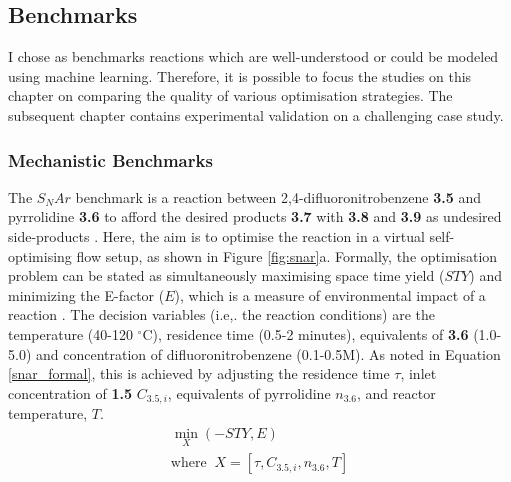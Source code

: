 \subsection{Benchmarks}

I chose as benchmarks reactions which are well-understood or could be modeled using machine learning. Therefore, it is possible to focus the studies on this chapter on comparing the quality of various optimisation strategies. The subsequent chapter contains experimental validation on a challenging case study.

\subsubsection{Mechanistic Benchmarks}\label{subsec:mechanistic_benchmarks}

The $S_NAr$ benchmark is a reaction between 2,4-difluoronitrobenzene \textbf{3.5} and pyrrolidine \textbf{3.6} to afford the desired products \textbf{3.7} with \textbf{3.8} and \textbf{3.9} as undesired side-products \cite{Hone2017}. Here, the aim is to optimise the reaction in a virtual self-optimising flow setup, as shown in Figure \ref{fig:snar}a. Formally, the optimisation problem can be stated as simultaneously maximising space time yield ($STY$) and minimizing the E-factor ($E$), which is a measure of environmental impact of a reaction  \cite{Sheldon2017}. The decision variables (i.e,. the reaction conditions) are the temperature (40-120 $^{\circ}$C), residence time (0.5-2 minutes), equivalents of \textbf{3.6} (1.0-5.0) and concentration of difluoronitrobenzene (0.1-0.5M). As noted in Equation \ref{snar_formal}, this is achieved by adjusting the residence time $\tau$, inlet concentration of \textbf{1.5} $C_{3.5,i}$, equivalents of pyrrolidine $n_{3.6}$, and reactor temperature, $T$.
\begin{equation}
	\label{snar_formal}
	\begin{gathered}
		\min_{X}{(-STY, E)} \\
		\text{where}\;\; X = [\tau,C_{3.5,i},n_{3.6}, T]
	\end{gathered}
\end{equation}


